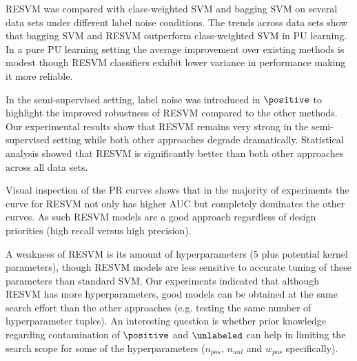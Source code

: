 RESVM was compared with class-weighted SVM and bagging SVM on several data sets under different label noise conditions. The trends across data sets show that bagging SVM and RESVM outperform class-weighted SVM in PU learning. In a pure PU learning setting the average improvement over existing methods is modest though RESVM classifiers exhibit lower variance in performance making it more reliable.

In the semi-supervised setting, label noise was introduced in $\positive$ to highlight the improved robustness of RESVM compared to the other methods. Our experimental results show that RESVM remains very strong in the semi-supervised setting while both other approaches degrade dramatically. Statistical analysis showed that RESVM is significantly better than both other approaches across all data sets.



Visual inspection of the PR curves shows that in the majority of experiments the curve for RESVM not only has higher AUC but completely dominates the other curves. As such RESVM models are a good approach regardless of design priorities (high recall versus high precision).

A weakness of RESVM is its amount of hyperparameters ($5$ plus potential kernel parameters), though RESVM models are less sensitive to accurate tuning of these parameters than standard SVM. Our experiments indicated that although RESVM has more hyperparameters, good models can be obtained at the same search effort than the other approaches (e.g. testing the same number of hyperparameter tuples). An interesting question is whether prior knowledge regarding contamination of $\positive$ and $\unlabeled$ can help in limiting the search scope for some of the hyperparameters ($n_{pos}$, $n_{unl}$ and $w_{pos}$ specifically).





\cleardoublepage

